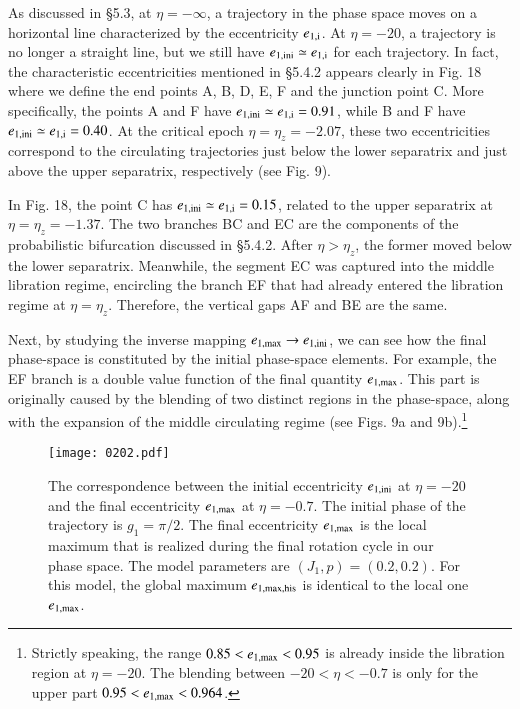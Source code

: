 \documentclass[useAMS,usenatbib,twocolumn]{mn2e}
\begin{document}
As discussed in \S 5.3, at $\eta=-\infty$, a trajectory in the phase space moves on a horizontal line characterized by the eccentricity  $e_{\rm 1,i}$.
At $\eta=-20$, a trajectory is no longer a straight line, but we still have 
$e_{\rm 1,ini}\simeq e_{\rm 1,i}$ for each  trajectory.  
In fact, the characteristic eccentricities mentioned in \S 5.4.2 appears clearly in Fig. 18 where we define the end points A, B, D, E, F and the junction point C. 
More specifically, the points A and F have $e_{\rm 1,ini}\simeq e_{\rm 1,i}=0.91$, while B and F have $e_{\rm 1,ini}\simeq e_{\rm 1,i}=0.40$. At the critical epoch  $\eta=\eta_z=-2.07$, these two eccentricities correspond to the circulating trajectories just below the lower separatrix and just above the upper separatrix, respectively (see Fig. 9). 

In Fig. 18,   the point C has  $e_{\rm 1,ini}\simeq e_{\rm 1,i}=0.15$, related to the upper separatrix at $\eta=\eta_z=-1.37$.  The two branches BC and EC are the components of the probabilistic bifurcation discussed in \S 5.4.2.  After $\eta>\eta_z$, the former moved below the lower separatrix.  Meanwhile, the segment EC was captured into the middle libration regime, encircling the branch EF that had  already entered the libration regime at $\eta=\eta_z$.  Therefore, the vertical gaps AF and BE are the same. 


Next, by studying the inverse mapping $e_{\rm 1,max}\to e_{\rm 1,ini}$, we can see how the final phase-space is constituted by the initial phase-space elements.  For example, the EF branch is a double value function of  the final quantity $e_{\rm 1,max}$.    This part is originally caused by the blending of two distinct regions in the phase-space, along with the expansion of the middle circulating regime (see Figs. 9a and 9b).\footnote{Strictly speaking, the range $0.85<e_{\rm 1,max}<  0.95$ is already inside the libration region at $\eta=-20$.  The blending between $-20<\eta<-0.7$ is only for the upper part $0.95<e_{\rm 1,max}<  0.964$. }





\begin{figure}
\begin{center}
\texttt{[image: 0202.pdf]}
\caption{The correspondence between the initial eccentricity $e_{\rm 1,ini}$ at $\eta=-20$ and the final eccentricity $e_{\rm 1,max}$  at $\eta=-0.7$.  The initial phase of  the trajectory is $g_1=\pi/2$. The final eccentricity $e_{\rm 1,max}$ is the local maximum that is realized during the final rotation cycle in our phase space.  The model parameters are $(J_1,p)=(0.2,0.2)$.  For this model, the global maximum $e_{\rm 1,max,his}$ is identical to the local one $e_{\rm 1,max}$.}
\label{fig:17}
\end{center}
\end{figure}
\end{document}

